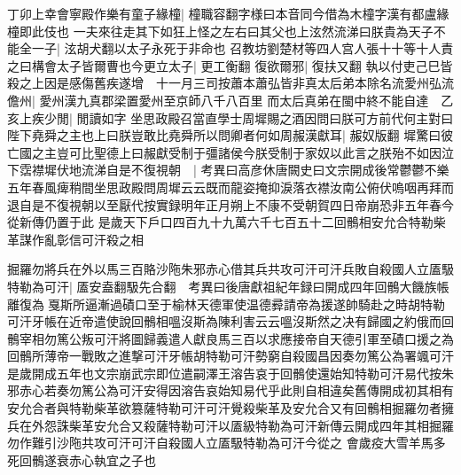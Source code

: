 丁卯上幸會寧殿作樂有童子緣橦|{
	橦職容翻字様曰本音同今借為木橦字漢有都盧緣橦即此伎也}
一夫來往走其下如狂上怪之左右曰其父也上泫然流涕曰朕貴為天子不能全一子|{
	泫胡犬翻以太子永死于非命也}
召教坊劉楚材等四人宫人張十十等十人責之曰構會太子皆爾曹也今更立太子|{
	更工衡翻}
復欲爾邪|{
	復扶又翻}
執以付吏己巳皆殺之上因是感傷舊疾遂增　十一月三司按蕭本蕭弘皆非真太后弟本除名流愛州弘流儋州|{
	愛州漢九真郡梁置愛州至京師八千八百里}
而太后真弟在閩中終不能自達　乙亥上疾少閒|{
	閒讀如字}
坐思政殿召當直學士周墀賜之酒因問曰朕可方前代何主對曰陛下堯舜之主也上曰朕豈敢比堯舜所以問卿者何如周赧漢獻耳|{
	赧奴版翻}
墀驚曰彼亡國之主豈可比聖德上曰赧獻受制于彊諸侯今朕受制于家奴以此言之朕殆不如因泣下霑襟墀伏地流涕自是不復視朝　|{
	考異曰高彦休唐闕史曰文宗開成後常鬱鬱不樂五年春風痺稍間坐思政殿問周墀云云既而龍姿掩抑淚落衣襟汝南公俯伏嗚咽再拜而退自是不復視朝以至厭代按實録明年正月朔上不康不受朝賀四日帝崩恐非五年春今從新傳仍置于此}
是歲天下戶口四百九十九萬六千七百五十二回鶻相安允合特勒柴革謀作亂彰信可汗殺之相

掘羅勿將兵在外以馬三百賂沙陁朱邪赤心借其兵共攻可汗可汗兵敗自殺國人立㕎馺特勒為可汗|{
	㕎安盍翻馺先合翻　考異曰後唐獻祖紀年録曰開成四年回鶻大饑族帳離復為戛斯所逼漸過磧口至于榆林天德軍使温德彛請帝為援遂帥騎赴之時胡特勒可汗牙帳在近帝遣使說回鶻相嗢沒斯為陳利害云云嗢沒斯然之决有歸國之約俄而回鶻宰相勿篤公叛可汗將圖歸義遣人獻良馬三百以求應接帝自天德引軍至磧口援之為回鶻所薄帝一戰敗之進撃可汗牙帳胡特勒可汗勢窮自殺國昌因奏勿篤公為署颯可汗是歲開成五年也文宗崩武宗即位遣嗣澤王溶告哀于回鶻使還始知特勒可汗易代按朱邪赤心若奏勿篤公為可汗安得因溶告哀始知易代乎此則自相違矣舊傳開成初其相有安允合者與特勒柴革欲篡薩特勒可汗可汗覺殺柴革及安允合又有回鶻相掘羅勿者擁兵在外怨誅柴革安允合又殺薩特勒可汗以㕎級特勒為可汗新傳云開成四年其相掘羅勿作難引沙陁共攻可汗可汗自殺國人立㕎馺特勒為可汗今從之}
會歲疫大雪羊馬多死回鶻遂衰赤心執宜之子也

